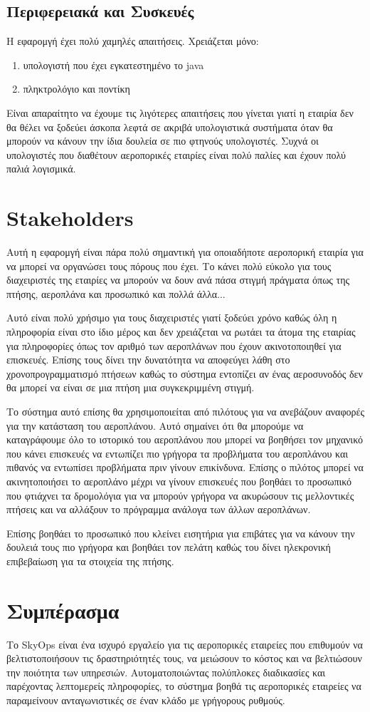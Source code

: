 \documentclass{article}
\begin{document}
	\subsection{Περιφερειακά και Συσκευές}
	Η εφαρομγή έχει πολύ χαμηλές απαιτήσεις. Χρειάζεται μόνο:
	\begin{enumerate}
		\item υπολογιστή που έχει εγκατεστημένο το java 
		\item πληκτρολόγιο και ποντίκη
	\end{enumerate}
	Είναι απαραίτητο να έχουμε τις λιγότερες απαιτήσεις που γίνεται γιατί η εταιρία δεν θα θέλει
	να ξοδεύει άσκοπα λεφτά σε ακριβά υπολογιστικά συστήματα όταν θα μπορούν να κάνουν την ίδια
	δουλεία σε πιο φτηνούς υπολογιστές. Συχνά οι υπολογιστές που διαθέτουν αεροπορικές εταιρίες
	είναι πολύ παλίες και έχουν πολύ παλιά λογισμικά.
	
	\section{Stakeholders}
	Αυτή η εφαρομγή είναι πάρα πολύ σημαντική για οποιαδήποτε αεροπορική εταιρία για να μπορεί να οργανώσει τους
	πόρους που έχει. Το κάνει πολύ εύκολο για τους διαχειριστές της εταιρίες να μπορούν να δουν ανά πάσα στιγμή
	πράγματα όπως της πτήσης, αεροπλάνα και προσωπικό και πολλά άλλα...

	Αυτό είναι πολύ χρήσιμο για τους διαχειριστές γιατί ξοδεύει χρόνο καθώς όλη η πληροφορία είναι στο ίδιο μέρος
	και δεν χρειάζεται να ρωτάει τα άτομα της εταιρίας για πληροφορίες όπως τον αριθμό των αεροπλάνων που έχουν
	ακινοτοποιηθεί για επισκευές. Επίσης τους δίνει την δυνατότητα να αποφεύγει λάθη στο χρονοπρογραμματισμό
	πτήσεων καθώς το σύστημα εντοπίζει αν ένας αεροσυνοδός δεν θα μπορεί να είναι σε μια πτήση μια συγκεκριμμένη στιγμή.

	Το σύστημα αυτό επίσης θα χρησιμοποιείται από πιλότους για να ανεβάζουν αναφορές για την κατάσταση του αεροπλάνου.
	Αυτό σημαίνει ότι θα μπορούμε να καταγράφουμε όλο το ιστορικό του αεροπλάνου που μπορεί να βοηθήσει τον μηχανικό
	που κάνει επισκευές να εντωπίζει πιο γρήγορα τα προβλήματα του αεροπλάνου και πιθανός να εντωπίσει προβλήματα πριν
	γίνουν επικίνδυνα. Επίσης ο πιλότος μπορεί να ακινητοποιήσει το αεροπλάνο μέχρι να γίνουν επισκευές που βοηθάει
	το προσωπικό που φτιάχνει τα δρομολόγια για να μπορούν γρήγορα να ακυρώσουν τις μελλοντικές πτήσεις και να αλλάξουν
	το πρόγραμμα ανάλογα των άλλων αεροπλάνων. 

	Επίσης βοηθάει το προσωπικό που κλείνει εισητήρια για επιβάτες για να κάνουν την δουλειά τους πιο γρήγορα και βοηθάει
	τον πελάτη καθώς του δίνει ηλεκρονική επιβεβαίωση για τα στοιχεία της πτήσης.
	
	\section{Συμπέρασμα}
	Το SkyOps είναι ένα ισχυρό εργαλείο για τις 
	αεροπορικές εταιρείες που επιθυμούν να βελτιστοποιήσουν τις 
	δραστηριότητές τους, να μειώσουν το κόστος και να βελτιώσουν 
	την ποιότητα των υπηρεσιών. Αυτοματοποιώντας πολύπλοκες 
	διαδικασίες και παρέχοντας λεπτομερείς πληροφορίες, το σύστημα 
	βοηθά τις αεροπορικές εταιρείες να παραμείνουν ανταγωνιστικές 
	σε έναν κλάδο με γρήγορους ρυθμούς.
	
\end{document}
